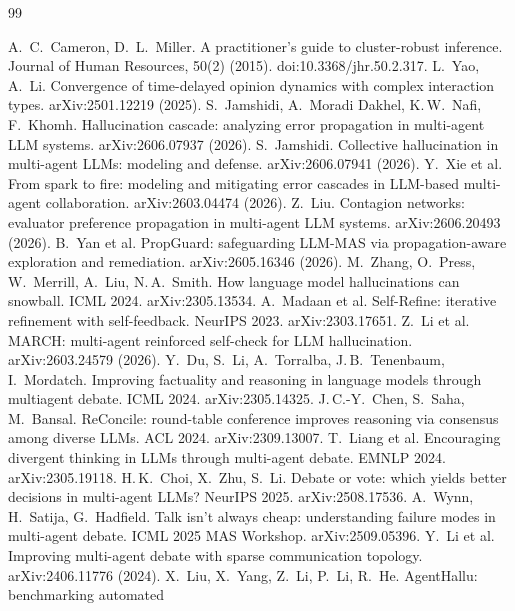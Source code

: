 \documentclass[11pt]{article}
\theoremstyle{definition}
\begin{document}
\begin{thebibliography}{99}

 A.\ C.\ Cameron, D.\ L.\ Miller. A practitioner's guide to cluster-robust
inference. Journal of Human Resources, 50(2) (2015). doi:10.3368/jhr.50.2.317.
 L.\ Yao, A.\ Li. Convergence of time-delayed opinion dynamics with complex interaction
types. arXiv:2501.12219 (2025).
 S.\ Jamshidi, A.\ Moradi Dakhel, K.\,W.\ Nafi, F.\ Khomh. Hallucination
cascade: analyzing error propagation in multi-agent LLM systems. arXiv:2606.07937 (2026).
 S.\ Jamshidi. Collective hallucination in multi-agent LLMs: modeling and
defense. arXiv:2606.07941 (2026).
 Y.\ Xie et al. From spark to fire: modeling and mitigating error cascades in
LLM-based multi-agent collaboration. arXiv:2603.04474 (2026).
 Z.\ Liu. Contagion networks: evaluator preference propagation in multi-agent LLM
systems. arXiv:2606.20493 (2026).
 B.\ Yan et al. PropGuard: safeguarding LLM-MAS via propagation-aware exploration
and remediation. arXiv:2605.16346 (2026).
 M.\ Zhang, O.\ Press, W.\ Merrill, A.\ Liu, N.\,A.\ Smith. How language model
hallucinations can snowball. ICML 2024. arXiv:2305.13534.
 A.\ Madaan et al. Self-Refine: iterative refinement with self-feedback. NeurIPS
2023. arXiv:2303.17651.
 Z.\ Li et al. MARCH: multi-agent reinforced self-check for LLM hallucination.
arXiv:2603.24579 (2026).
 Y.\ Du, S.\ Li, A.\ Torralba, J.\,B.\ Tenenbaum, I.\ Mordatch. Improving factuality and
reasoning in language models through multiagent debate. ICML 2024. arXiv:2305.14325.
 J.\,C.-Y.\ Chen, S.\ Saha, M.\ Bansal. ReConcile: round-table conference improves
reasoning via consensus among diverse LLMs. ACL 2024. arXiv:2309.13007.
 T.\ Liang et al. Encouraging divergent thinking in LLMs through multi-agent debate.
EMNLP 2024. arXiv:2305.19118.
 H.\,K.\ Choi, X.\ Zhu, S.\ Li. Debate or vote: which yields better decisions in
multi-agent LLMs? NeurIPS 2025. arXiv:2508.17536.
 A.\ Wynn, H.\ Satija, G.\ Hadfield. Talk isn't always cheap: understanding
failure modes in multi-agent debate. ICML 2025 MAS Workshop. arXiv:2509.05396.
 Y.\ Li et al. Improving multi-agent debate with sparse communication topology.
arXiv:2406.11776 (2024).
 X.\ Liu, X.\ Yang, Z.\ Li, P.\ Li, R.\ He. AgentHallu: benchmarking automated

\end{thebibliography}
\end{document}

